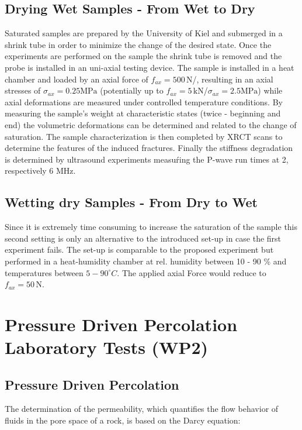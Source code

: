 \subsection{Drying Wet Samples - From Wet to Dry}
Saturated samples are prepared by the University of Kiel and submerged in a shrink tube in order to minimize the change of the desired state. Once the experiments are performed on the sample the shrink tube is removed and the probe is installed in an uni-axial testing device. The sample is installed in a heat chamber and loaded by an axial force of $f_{ax} = 500 \, \text{N}$/, resulting in an axial stresses of $ \sigma_{ax} = 0.25 \text{MPa}$ (potentially up to $f_{ax} = 5 \, \text{kN}$/$ \sigma_{ax} = 2.5 \text{MPa}$) while axial deformations are measured under controlled temperature conditions. By measuring the sample's weight at characteristic states (twice - beginning and end) the volumetric deformations can be determined and related to the change of saturation. The sample characterization is then completed by XRCT scans to determine the features of the induced fractures. Finally the stiffness degradation is determined by ultrasound experiments measuŕing the P-wave run times at 2, respectively 6 MHz.

\subsection{Wetting dry Samples - From Dry to Wet}
Since it is extremely time consuming to increase the saturation of the sample this second setting is only an alternative to the introduced set-up in case the first experiment fails. The set-up is comparable to the proposed experiment but performed in a heat-humidity chamber at rel. humidity between 10 - 90 \% and temperatures between $5-90^\circ C$. The applied axial Force would reduce to $f_{ax} = 50 \, \text{N}$.

\section{Pressure Driven Percolation Laboratory Tests (WP2)}
\subsection{Pressure Driven Percolation}
The determination of the permeability, which quantifies the flow behavior of fluids in the pore space of a rock, is based on the 
Darcy equation:

